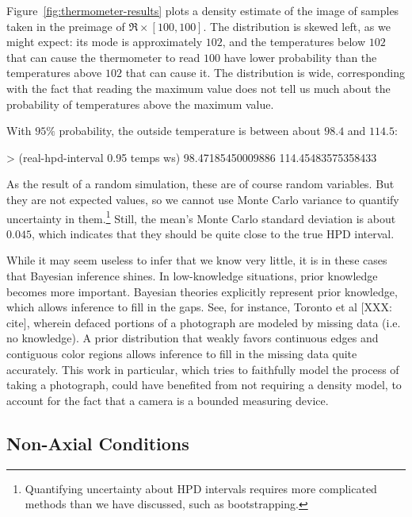 Figure~\ref{fig:thermometer-results} plots a density estimate of the image of samples taken in the preimage of $\Re \times [100,100]$.
The distribution is skewed left, as we might expect: its mode is approximately $102$, and the temperatures below $102$ that can cause the thermometer to read $100$ have lower probability than the temperatures above $102$ that can cause it.
The distribution is wide, corresponding with the fact that reading the maximum value does not tell us much about the probability of temperatures above the maximum value.

With $95\%$ probability, the outside temperature is between about $98.4$ and $114.5$:
\begin{center}\singlespacing
\begin{schemedisplay}
> (real-hpd-interval 0.95 temps ws)
98.47185450009886
114.45483575358433
\end{schemedisplay}
\end{center}
As the result of a random simulation, these are of course random variables.
But they are not expected values, so we cannot use Monte Carlo variance to quantify uncertainty in them.\footnote{Quantifying uncertainty about HPD intervals requires more complicated methods than we have discussed, such as bootstrapping.}
Still, the mean's Monte Carlo standard deviation is about $0.045$, which indicates that they should be quite close to the true HPD interval.

While it may seem useless to infer that we know very little, it is in these cases that Bayesian inference shines.
In low-knowledge situations, prior knowledge becomes more important.
Bayesian theories explicitly represent prior knowledge, which allows inference to fill in the gaps.
See, for instance, Toronto et al [XXX: cite], wherein defaced portions of a photograph are modeled by missing data (i.e. no knowledge).
A prior distribution that weakly favors continuous edges and contiguous color regions allows inference to fill in the missing data quite accurately.
This work in particular, which tries to faithfully model the process of taking a photograph, could have benefited from not requiring a density model, to account for the fact that a camera is a bounded measuring device.


\subsection{Non-Axial Conditions}

